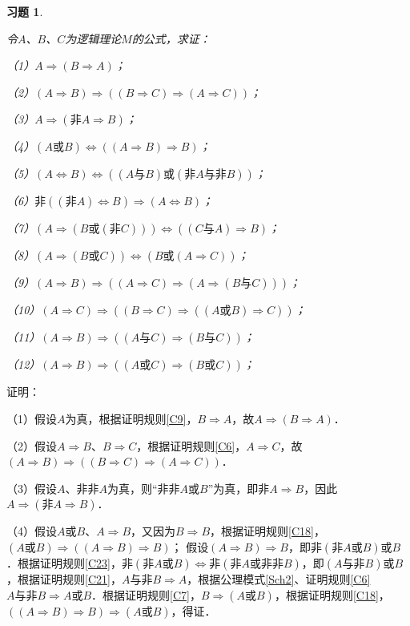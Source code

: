 \documentclass[12pt, a4paper, oneside]{book}
\newtheorem{exer}{习题}
\begin{document}
			\begin{exer}\label{exer8}
				\hfill\par
				令$A$、$B$、$C$为逻辑理论$M$的公式，求证：
				\par
				（1）$A\Rightarrow (B\Rightarrow A)$；
				\par
				（2）$(A\Rightarrow B)\Rightarrow ((B\Rightarrow C)\Rightarrow (A\Rightarrow C))$；
				\par
				（3）$A\Rightarrow (\text{非}A\Rightarrow B)$；
				\par
				（4）$(A\text{或}B)\Leftrightarrow ((A\Rightarrow B)\Rightarrow B)$；
				\par
				（5）$(A\Leftrightarrow B)\Leftrightarrow ((A\text{与}B)\text{或}(\text{非}A\text{与}\text{非}B))$；
				\par
				（6）$\text{非}((\text{非}A)\Leftrightarrow B)\Rightarrow (A\Leftrightarrow B)$；
				\par
				（7）$(A\Rightarrow (B\text{或}(\text{非}C)))\Leftrightarrow ((C\text{与}A)\Rightarrow B)$；
				\par
				（8）$(A\Rightarrow (B\text{或}C))\Leftrightarrow (B\text{或}(A\Rightarrow C))$；
				\par
				（9）$(A\Rightarrow B)\Rightarrow ((A\Rightarrow C)\Rightarrow (A\Rightarrow (B\text{与}C)))$；
				\par
				（10）$(A\Rightarrow C)\Rightarrow ((B\Rightarrow C)\Rightarrow ((A\text{或}B)\Rightarrow C))$；
				\par
				（11）$(A\Rightarrow B)\Rightarrow ((A\text{与}C)\Rightarrow (B\text{与}C))$；
				\par
				（12）$(A\Rightarrow B)\Rightarrow ((A\text{或}C)\Rightarrow (B\text{或}C))$；
			\end{exer}
			证明：
			\par
			（1）假设$A$为真，根据证明规则\ref{C9}，$B\Rightarrow A$，故$A\Rightarrow (B\Rightarrow A)$．
			\par
			（2）假设$A\Rightarrow B$、$B\Rightarrow C$，根据证明规则\ref{C6}，$A\Rightarrow C$，故$(A\Rightarrow B)\Rightarrow ((B\Rightarrow C)\Rightarrow (A\Rightarrow C))$．
			\par
			（3）假设$A$、$\text{非}\text{非}A$为真，则“$\text{非}\text{非}A\text{或}B$”为真，即$\text{非}A\Rightarrow B$，因此$A\Rightarrow (\text{非}A\Rightarrow B)$．
			\par
			（4）假设$A\text{或}B$、$A\Rightarrow B$，又因为$B\Rightarrow B$，根据证明规则\ref{C18}，$(A\text{或}B)\Rightarrow ((A\Rightarrow B)\Rightarrow B)$；
			假设$(A\Rightarrow B)\Rightarrow B$，即$\text{非}(\text{非}A\text{或}B)\text{或}B$．根据证明规则\ref{C23}，$\text{非}(\text{非}A\text{或}B)\Leftrightarrow \text{非}(\text{非}A\text{或}\text{非}\text{非}B)$，即$(A\text{与}\text{非}B)\text{或}B$，根据证明规则\ref{C21}，$A\text{与}\text{非}B\Rightarrow A$，根据公理模式\ref{Sch2}、证明规则\ref{C6} $A\text{与}\text{非}B\Rightarrow A\text{或}B$．根据证明规则\ref{C7}，$B\Rightarrow (A\text{或}B)$，根据证明规则\ref{C18}，$((A\Rightarrow B)\Rightarrow B)\Rightarrow (A\text{或}B)$，得证．
\end{document}

